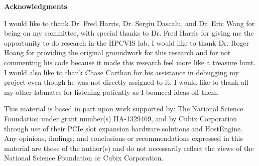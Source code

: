 \newpage
{}
\begin{center}
  \bf {Acknowledgments}
\end{center}

I would like to thank Dr. Fred Harris, Dr. Sergiu Dascalu, and Dr. Eric Wang for being on my committee, with special thanks to Dr. Fred Harris for giving me the opportunity to do research in the HPCVIS lab. I would like to thank Dr. Roger Hoang for providing the original groundwork for this research and for not commenting his code because it made this research feel more like a treasure hunt. I would also like to thank Chase Carthan for his assistance in debugging my project even though he was not directly assigned to it. I would like to thank all my other labmates for listening patiently as I bounced ideas off them. 


This material is based in part upon work supported by: The National Science Foundation under grant number(s) IIA-1329469, and by Cubix Corporation through use of their PCIe slot expansion hardware solutions and HostEngine. Any opinions, findings, and conclusions or recommendations expressed in this material are those of the author(s) and do not necessarily reflect the views of the National Science Foundation or Cubix Corporation.